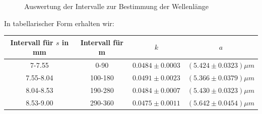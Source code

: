 \documentclass[12pt,a4paper]{article}
\begin{document}
\begin{figure}[H]
	\centering
	\qquad
	\caption{Auswertung der Intervalle zur Bestimmung der Wellenlänge}
	\label{fig:lambda_Intervall}
\end{figure}
In tabellarischer Form erhalten wir:
\begin{center}
	\begin{tabular}{|c|c|c|c|}
		\hline 
		Intervall für $s$ in mm&Intervall für m& $k$  & $a$ \\
		\hline 
		\hline 
		7-7.55&0-90& $0.0484\pm0.0003$ &$(5.424\pm0.0323)\mu m$  \\ 
		\hline 
		7.55-8.04& 100-180 & $0.0491\pm0.0023$& $(5.366\pm0.0379)\mu m$ \\ 
		\hline 
		8.04-8.53&190-280& $0.0484\pm0.0007$ & $(5.430\pm0.0323)\mu m$ \\ 
		\hline 
		8.53-9.00& 290-360 & $0.0475\pm0.0011$ & $(5.642\pm0.0454)\mu m$ \\ 
		\hline 
	\end{tabular}  
\end{center}
\end{document}
